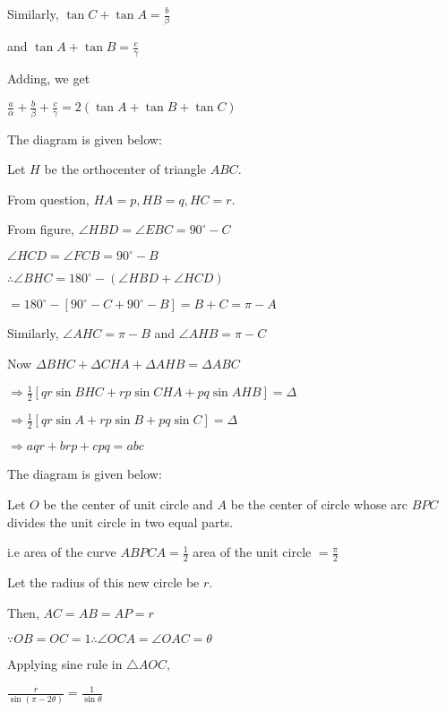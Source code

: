   Similarly, $\tan C + \tan A = \frac{b}{\beta}$

  and $\tan A + \tan B = \frac{c}{\gamma}$

  Adding, we get

  $\frac{a}{\alpha} + \frac{b}{\beta} + \frac{c}{\gamma} = 2(\tan A + \tan B + \tan C)$

\item The diagram is given below:

  \startplacefigure
    \externalfigure[18_18.pdf]
  \stopplacefigure

  Let $H$ be the orthocenter of triangle $ABC.$

  From question, $HA = p, HB = q, HC = r.$

  From figure, $\angle HBD = \angle EBC = 90^\circ - C$

  $\angle HCD = \angle FCB = 90^\circ - B$

  $\therefore \angle BHC = 180^\circ - (\angle HBD + \angle HCD)$

  $= 180^\circ - [90^\circ - C + 90^\circ - B] = B + C = \pi - A$

  Similarly, $\angle AHC = \pi - B$ and $\angle AHB = \pi - C$

  Now $\Delta BHC + \Delta CHA + \Delta AHB = \Delta ABC$

  $\Rightarrow \frac{1}{2}[qr\sin BHC + rp\sin CHA + pq \sin AHB] = \Delta$

  $\Rightarrow \frac{1}{2}[qr\sin A + rp\sin B + pq\sin C] = \Delta$

  $\Rightarrow aqr + brp + cpq = abc$

\item The diagram is given below:

  \startplacefigure
    \externalfigure[18_19.pdf]
  \stopplacefigure

  Let $O$ be the center of unit circle and $A$ be the center of circle whose arc $BPC$ divides the unit circle
  in two equal parts.

  i.e area of the curve $ABPCA = \frac{1}{2}$ area of the unit circle $= \frac{\pi}{2}$

  Let the radius of this new circle be $r.$

  Then, $AC = AB = AP = r$

  $\because OB = OC = 1 \therefore \angle OCA = \angle OAC = \theta$

  Applying sine rule in $\triangle AOC,$

  $\frac{r}{\sin(\pi -2\theta)} = \frac{1}{\sin\theta}$

